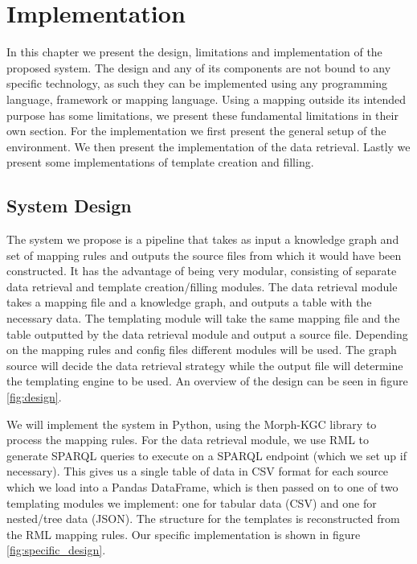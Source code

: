 \chapter{Implementation}
\label{chapter:implementation}
In this chapter we present the design, limitations and implementation of the proposed system. The design and any of its components are not bound to any specific technology, as such they can be implemented using any programming language, framework or mapping language. Using a mapping outside its intended purpose has some limitations, we present these fundamental limitations in their own section. For the implementation we first present the general setup of the environment. We then present the implementation of the data retrieval. Lastly we present some implementations of template creation and filling.

\section{System Design}
The system we propose is a pipeline that takes as input a knowledge graph and set of mapping rules and outputs the source files from which it would have been constructed. It has the advantage of being very modular, consisting of separate data retrieval and template creation/filling modules. The data retrieval module takes a mapping file and a knowledge graph, and outputs a table with the necessary data. The templating module will take the same mapping file and the table outputted by the data retrieval module and output a source file. Depending on the mapping rules and config files different modules will be used. The graph source will decide the data retrieval strategy while the output file will determine the templating engine to be used. An overview of the design can be seen in figure \ref{fig:design}.

We will implement the system in Python, using the Morph-KGC library to process the mapping rules. For the data retrieval module, we use RML to generate SPARQL queries to execute on a SPARQL endpoint (which we set up if necessary). This gives us a single table of data in CSV format for each source which we load into a Pandas DataFrame, which is then passed on to one of two templating modules we implement: one for tabular data (CSV) and one for nested/tree data (JSON). The structure for the templates is reconstructed from the RML mapping rules. Our specific implementation is shown in figure \ref{fig:specific_design}.

